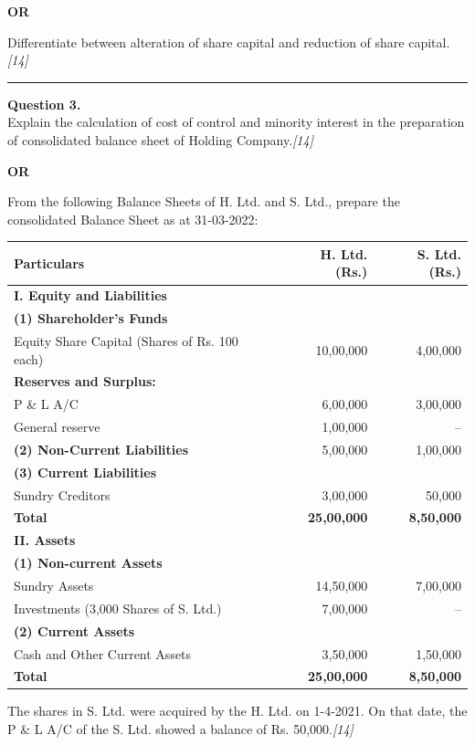\documentclass[11pt,a4paper]{article}
\newcommand{\pts}[1]{\hfill   \textit{[#1]}}
\begin{document}
\centerline{   \textbf{OR}}




\noindent Differentiate between alteration of share capital and reduction of share capital.\pts{14}

\medskip\rule{\linewidth}{0.2pt}




\noindent   \textbf{Question 3.} \\
Explain the calculation of cost of control and minority interest in the preparation of consolidated balance sheet of Holding Company.\pts{14}

\centerline{   \textbf{OR}}




\noindent From the following Balance Sheets of H. Ltd. and S. Ltd., prepare the consolidated Balance Sheet as at 31-03-2022:

\begin{center}
  
\begin{tabular}{|p{6.0cm}|r|r|}
    \hline
   \textbf{Particulars} &   \textbf{H. Ltd. (Rs.)} &   \textbf{S. Ltd. (Rs.)} \\ \hline
   \textbf{I. Equity and Liabilities} & & \\
   \textbf{(1) Shareholder's Funds} & & \\
    \quad Equity Share Capital (Shares of Rs. 100 each) & 10,00,000 & 4,00,000 \\
    \quad   \textbf{Reserves and Surplus:} & & \\
    \quad P \& L A/C & 6,00,000 & 3,00,000 \\
    \quad General reserve & 1,00,000 & -- \\
   \textbf{(2) Non-Current Liabilities} & 5,00,000 & 1,00,000 \\
   \textbf{(3) Current Liabilities} & & \\
    \quad Sundry Creditors & 3,00,000 & 50,000 \\ \hline
   \textbf{Total} &   \textbf{25,00,000} &   \textbf{8,50,000} \\ \hline
   \textbf{II. Assets} & & \\
   \textbf{(1) Non-current Assets} & & \\
    \quad Sundry Assets & 14,50,000 & 7,00,000 \\
    \quad Investments (3,000 Shares of S. Ltd.) & 7,00,000 & -- \\
   \textbf{(2) Current Assets} & & \\
    \quad Cash and Other Current Assets & 3,50,000 & 1,50,000 \\ \hline
   \textbf{Total} &   \textbf{25,00,000} &   \textbf{8,50,000} \\ \hline
  \end{tabular}
\end{center}
The shares in S. Ltd. were acquired by the H. Ltd. on 1-4-2021. On that date, the P \& L A/C of the S. Ltd. showed a balance of Rs. 50,000.\pts{14}
\end{document}
